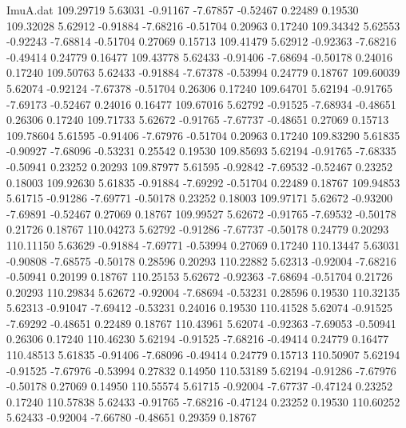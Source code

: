 \begin{filecontents}{ImuA.dat}
 109.29719    5.63031   -0.91167   -7.67857   -0.52467    0.22489    0.19530
 109.32028    5.62912   -0.91884   -7.68216   -0.51704    0.20963    0.17240
 109.34342    5.62553   -0.92243   -7.68814   -0.51704    0.27069    0.15713
 109.41479    5.62912   -0.92363   -7.68216   -0.49414    0.24779    0.16477
 109.43778    5.62433   -0.91406   -7.68694   -0.50178    0.24016    0.17240
 109.50763    5.62433   -0.91884   -7.67378   -0.53994    0.24779    0.18767
 109.60039    5.62074   -0.92124   -7.67378   -0.51704    0.26306    0.17240
 109.64701    5.62194   -0.91765   -7.69173   -0.52467    0.24016    0.16477
 109.67016    5.62792   -0.91525   -7.68934   -0.48651    0.26306    0.17240
 109.71733    5.62672   -0.91765   -7.67737   -0.48651    0.27069    0.15713
 109.78604    5.61595   -0.91406   -7.67976   -0.51704    0.20963    0.17240
 109.83290    5.61835   -0.90927   -7.68096   -0.53231    0.25542    0.19530
 109.85693    5.62194   -0.91765   -7.68335   -0.50941    0.23252    0.20293
 109.87977    5.61595   -0.92842   -7.69532   -0.52467    0.23252    0.18003
 109.92630    5.61835   -0.91884   -7.69292   -0.51704    0.22489    0.18767
 109.94853    5.61715   -0.91286   -7.69771   -0.50178    0.23252    0.18003
 109.97171    5.62672   -0.93200   -7.69891   -0.52467    0.27069    0.18767
 109.99527    5.62672   -0.91765   -7.69532   -0.50178    0.21726    0.18767
 110.04273    5.62792   -0.91286   -7.67737   -0.50178    0.24779    0.20293
 110.11150    5.63629   -0.91884   -7.69771   -0.53994    0.27069    0.17240
 110.13447    5.63031   -0.90808   -7.68575   -0.50178    0.28596    0.20293
 110.22882    5.62313   -0.92004   -7.68216   -0.50941    0.20199    0.18767
 110.25153    5.62672   -0.92363   -7.68694   -0.51704    0.21726    0.20293
 110.29834    5.62672   -0.92004   -7.68694   -0.53231    0.28596    0.19530
 110.32135    5.62313   -0.91047   -7.69412   -0.53231    0.24016    0.19530
 110.41528    5.62074   -0.91525   -7.69292   -0.48651    0.22489    0.18767
 110.43961    5.62074   -0.92363   -7.69053   -0.50941    0.26306    0.17240
 110.46230    5.62194   -0.91525   -7.68216   -0.49414    0.24779    0.16477
 110.48513    5.61835   -0.91406   -7.68096   -0.49414    0.24779    0.15713
 110.50907    5.62194   -0.91525   -7.67976   -0.53994    0.27832    0.14950
 110.53189    5.62194   -0.91286   -7.67976   -0.50178    0.27069    0.14950
 110.55574    5.61715   -0.92004   -7.67737   -0.47124    0.23252    0.17240
 110.57838    5.62433   -0.91765   -7.68216   -0.47124    0.23252    0.19530
 110.60252    5.62433   -0.92004   -7.66780   -0.48651    0.29359    0.18767

\end{filecontents}
